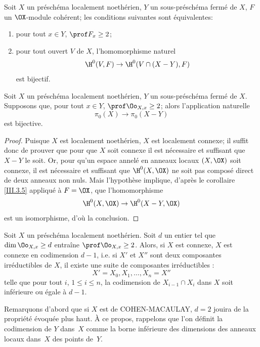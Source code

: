 \begin{corollaire} \label{III.3.5}
Soit $X$ un pr\'esch\'ema localement noeth\'erien, $Y$ un sous-pr\'esch\'ema ferm\'e de $X$, $F$ un $\OX$-module coh\'erent; les conditions suivantes sont \'equivalentes:
\begin{enumerate}
\item
pour tout $x\in Y$, $\prof F_x \geq 2$;
\item
pour tout ouvert $V$ de $X$, l'homomorphisme naturel
\[
\H^0(V, F) \to \H^0(V\cap(X-Y), F)
\]
est bijectif.
\end{enumerate}
\end{corollaire}
\egroup

\begin{theoreme}[HARTSHORNE] \label{III.3.6}
Soit $X$ un pr\'esch\'ema localement noeth\'erien, $Y$ un sous-pr\'esch\'ema ferm\'e de $X$. Supposons que, pour tout $x\in Y$, $\prof \Oo_{X, x} \geq 2$; alors l'application naturelle
\[
\pi_0(X) \to \pi_0(X-Y)
\]
est bijective.
\end{theoreme}

\begin{proof}
Puisque $X$ est localement noeth\'erien, $X$ est localement connexe; il suffit donc de prouver que pour que $X$ soit connexe il est n\'ecessaire et suffisant que $X-Y$ le soit. Or, pour qu'un espace annel\'e en anneaux  locaux $(X, \OX)$ soit connexe, il est n\'ecessaire et suffisant que $\H^0(X, \OX)$ ne soit pas compos\'e direct de deux anneaux non nuls. Mais l'hypoth\`ese implique, d'apr\`es le corollaire \ref{III.3.5} appliqu\'e \`a $F=\OX$, que l'homomorphisme
\[
\H^0(X, \OX) \to \H^0(X-Y, \OX)
\]
est un isomorphisme, d'o\`u la conclusion.
\skipqed
\end{proof}

\begin{corollaire} \label{III.3.7}
Soit $X$ un pr\'esch\'ema localement noeth\'erien. Soit $d$ un entier tel que $\dim \Oo_{X, x} \geq d$ entra\^ine $\prof \Oo_{X, x} \geq 2$. Alors, si $X$ est connexe, $X$ est connexe en codimension $d-1$, i.e. si $X'$ et $X''$ sont deux composantes irr\'eductibles de $X$, il existe une suite de composantes irr\'eductibles :
\[
X'=X_0, X_1, \ldots, X_n=X''
\]
telle que pour tout $i$, $1\leq i \leq n$, la codimension de $X_{i-1}\cap X_i$ dans $X$ soit inf\'erieure ou \'egale \`a $d-1$.
\end{corollaire}

Remarquons d'abord que si $X$ est de COHEN-MACAULAY, $d=2$ jouira de la propri\'et\'e \'evoqu\'ee plus haut. \`A ce propos, rappelons que l'on d\'efinit la codimension de $Y$ dans~$X$ comme la borne inf\'erieure des dimensions des anneaux locaux dans~$X$ des points de~$Y$.

